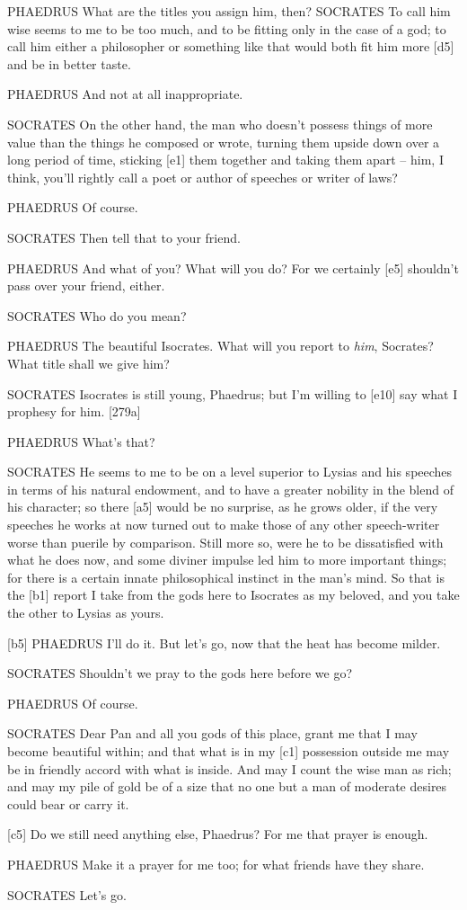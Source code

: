 PHAEDRUS What are the titles you assign him, then? SOCRATES To call him
wise seems to me to be too much, and to be fitting only in the case of a
god; to call him either a
philosopher or something
like that would both fit him more {[}d5{]} and be in better taste.

PHAEDRUS And not at all inappropriate.

SOCRATES On the other hand, the man who doesn't possess things of more
value than the things he composed or wrote, turning them upside down
over a long period of time, sticking {[}e1{]} them together and taking
them apart -- him, I think, you'll rightly call a poet or author of
speeches or writer of laws?

PHAEDRUS Of course.

SOCRATES Then tell that to your friend.

PHAEDRUS And what of you? What will you do? For we certainly {[}e5{]}
shouldn't pass over your friend, either.

SOCRATES Who do you mean?

PHAEDRUS The beautiful
Isocrates. What will you
report to {\em him}, Socrates? What title shall we give him?

SOCRATES Isocrates is still young, Phaedrus; but I'm willing to
{[}e10{]} say what I prophesy for him. {[}279a{]}

PHAEDRUS What's that?

SOCRATES He seems to me to be on a level superior to Lysias and his
speeches in terms of his natural endowment, and to have a greater
nobility in the blend of his character; so there {[}a5{]} would be no
surprise, as he grows older, if the very speeches he works at now turned
out to make those of any other speech-writer worse than puerile by
comparison. Still more so, were he to be dissatisfied with what he does
now, and some diviner impulse led him to more important things; for
there is a certain innate philosophical instinct in the man's mind. So
that is the {[}b1{]} report I take from the gods here to Isocrates as my
beloved, and you take the other to Lysias as yours.

{[}b5{]} PHAEDRUS I'll do it. But let's go, now that the heat has become
milder.

SOCRATES Shouldn't we pray to the gods here before we go?

PHAEDRUS Of course.

SOCRATES Dear Pan and all you gods of this place, grant me that I may
become beautiful within; and that what is in my {[}c1{]} possession
outside me may be in friendly accord with what is inside. And may I
count the wise man as rich; and may my pile of gold be of a size that no
one but a man of moderate
desires could bear or
carry it.

{[}c5{]} Do we still need anything else, Phaedrus? For me that prayer is
enough.

PHAEDRUS Make it a prayer for me too; for what friends have they share.

SOCRATES Let's go.

\stoptext
